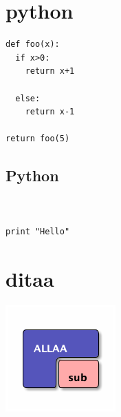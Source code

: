 \documentclass[12pt,a4paper]{article}
\begin{document}
\section{python}
\label{sec:orgac4d59b}
\lstset{breaklines=true,language=Python,label= ,caption= ,captionpos=b,firstnumber=1,numbers=left}
\begin{lstlisting}
def foo(x):
  if x>0:
    return x+1

  else:
    return x-1

return foo(5)
\end{lstlisting}
\subsection{Python}
\label{sec:orgfe399ab}
\lstset{breaklines=true,language=Python,label= ,caption= ,captionpos=b,firstnumber=1,numbers=left}
\begin{lstlisting}


print "Hello"

\end{lstlisting}

\section{ditaa}
\label{sec:org0194e75}
\begin{center}
\includegraphics[width=.9\linewidth]{blue.png}
\end{center}
\end{document}
